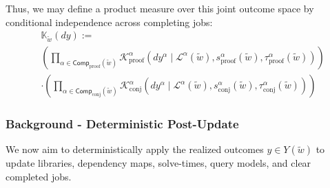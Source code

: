 \documentclass[letterpaper]{article} %
\begin{document}
Thus, we may define a product measure over this joint outcome space by conditional independence across completing jobs:
\begin{align*}
&\mathbb K_{\tilde w}(dy)
:=
\\&\left(\prod_{\alpha\in\mathsf{Comp}_{\mathrm{proof}}(\tilde w)}
\mathcal K^\alpha_{\mathrm{proof}}(dy^\alpha \mid \mathcal L^\alpha(\tilde w), s^\alpha_{\mathrm{proof}}(\tilde w),\tau^\alpha_{\mathrm{proof}}(\tilde w))
\right)
\\&\cdot\left(\prod_{\alpha\in\mathsf{Comp}_{\mathrm{conj}}(\tilde w)}
\mathcal K^\alpha_{\mathrm{conj}}(dy^\alpha \mid \mathcal L^\alpha(\tilde w), s^\alpha_{\mathrm{conj}}(\tilde w),\tau^\alpha_{\mathrm{conj}}(\tilde w))
\right)
\end{align*}

\subsubsection{Background - Deterministic Post-Update} 

We now aim to deterministically apply the realized outcomes $y\in Y(\tilde w)$ to update libraries, dependency maps, solve-times, query models, and clear completed jobs.
\end{document}
